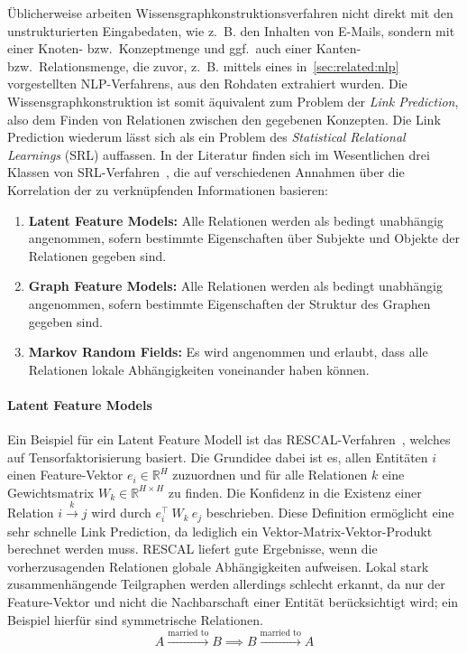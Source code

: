 Üblicherweise arbeiten Wissensgraphkonstruktionsverfahren nicht direkt mit den unstrukturierten Eingabedaten, wie z.~B. den Inhalten von E-Mails,
sondern mit einer Knoten- bzw.\ Konzeptmenge und ggf.\ auch einer Kanten- bzw.\ Relationsmenge, die zuvor, z.~B. mittels eines in~\ref{sec:related:nlp} vorgestellten NLP-Verfahrens, aus den Rohdaten extrahiert wurden.
Die Wissensgraphkonstruktion ist somit äquivalent zum Problem der \textit{Link Prediction}, also dem Finden von Relationen zwischen den gegebenen Konzepten.
Die Link Prediction wiederum lässt sich als ein Problem des \textit{Statistical Relational Learnings} (SRL) auffassen.
In der Literatur finden sich im Wesentlichen drei Klassen von SRL-Verfahren~\cite{Nickel2016}, die auf verschiedenen Annahmen über die Korrelation der zu verknüpfenden Informationen basieren:
\begin{enumerate}
	\item \textbf{Latent Feature Models:}
		Alle Relationen werden als bedingt unabhängig angenommen, sofern bestimmte Eigenschaften über Subjekte und Objekte der Relationen gegeben sind.
	\item \textbf{Graph Feature Models:}
		Alle Relationen werden als bedingt unabhängig angenommen, sofern bestimmte Eigenschaften der Struktur des Graphen gegeben sind.
	\item \textbf{Markov Random Fields:}
		Es wird angenommen und erlaubt, dass alle Relationen lokale Abhängigkeiten voneinander haben können.
\end{enumerate}

\paragraph{Latent Feature Models}
Ein Beispiel für ein Latent Feature Modell ist das RESCAL-Verfahren~\cite{Nickel2013}, welches auf Tensorfaktorisierung basiert.
Die Grundidee dabei ist es, allen Entitäten $i$ einen Feature-Vektor $e_i \in \mathbb{R}^H$ zuzuordnen und für alle Relationen $k$ eine Gewichtsmatrix $W_k \in \mathbb{R}^{H \times H}$ zu finden.
Die Konfidenz in die Existenz einer Relation $i \xrightarrow{k} j$ wird durch $e_i^\top\ W_k\ e_j$ beschrieben.
Diese Definition ermöglicht eine sehr schnelle Link Prediction, da lediglich ein Vektor-Matrix-Vektor-Produkt berechnet werden muss.
RESCAL liefert gute Ergebnisse, wenn die vorherzusagenden Relationen globale Abhängigkeiten aufweisen.
Lokal stark zusammenhängende Teilgraphen werden allerdings schlecht erkannt, da nur der Feature-Vektor und nicht die Nachbarschaft einer Entität berücksichtigt wird;
ein Beispiel hierfür sind symmetrische Relationen.
\[A \xrightarrow{\text{married to}} B \implies B \xrightarrow{\text{married to}} A\]

